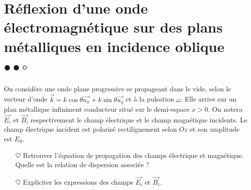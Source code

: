 \documentclass{report}
\begin{document}
\newpage

\section*{Réflexion d'une onde électromagnétique sur des plans métalliques en incidence oblique $\bullet\bullet\circ$}

On considère une onde plane progressive se propageant dans le vide, selon le vecteur d'onde $\vec{k}=k\cos\theta\vec{u_x}+k\sin\theta\vec{u_y}$ et à la pulsation $\omega$. Elle arrive sur un plan métallique infiniment conducteur situé sur le demi-espace $x>0$. On notera $\vec{E_i}$ et $\vec{B_i}$ respectivement le champ électrique et le champ magnétique incidents. Le champ électrique incident est polarisé rectilignement selon $Oz$ et son amplitude est $E_0$.

\begin{itemize}
		
	\item[$\heartsuit$]	Retrouver l'équation de propagation des champs électrique et magnétique. Quelle est la relation de dispersion associée ? 
	
	\item[$\heartsuit$] Expliciter les expressions des champs $\vec{E_i}$ et $\vec{B_i}$.
	
\end{itemize}
\end{document}
